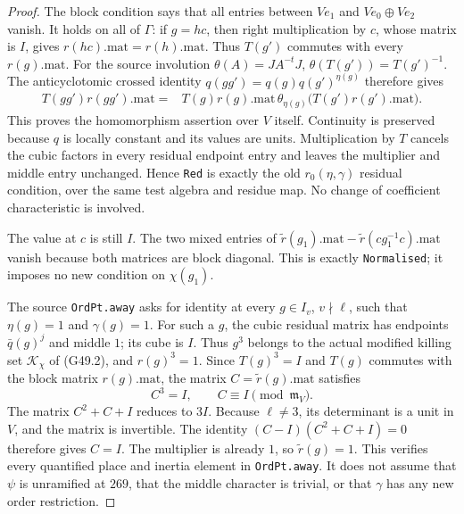 \begin{proof}
The block condition says that all entries between
\(V e_1\) and \(V e_0\oplus V e_2\) vanish.
It holds on all of \(\Gamma\): if \(g=hc\), then
right multiplication by \(c\), whose matrix is \(I\),
gives \(r(hc).\mathrm{mat}=r(h).\mathrm{mat}\).
Thus \(T(g')\) commutes with every \(r(g).\mathrm{mat}\).
For the source involution \(\theta(A)=JA^{-t}J\),
\(\theta(T(g'))=T(g')^{-1}\).
The anticyclotomic crossed identity
\(q(gg')=q(g)q(g')^{\eta(g)}\) therefore gives
\[
 \begin{split}
 T(gg')r(gg').\mathrm{mat}
  ={}&T(g)r(g).\mathrm{mat}\,
       \theta_{\eta(g)}
        \bigl(T(g')r(g').\mathrm{mat}\bigr).
 \end{split}
 \tag{G60.5}
\]
This proves the homomorphism assertion over \(V\) itself.
Continuity is preserved because \(q\) is locally constant
and its values are units.  Multiplication by \(T\) cancels
the cubic factors in every residual endpoint entry and
leaves the multiplier and middle entry unchanged.
Hence \texttt{Red} is exactly the old \(r_0(\eta,\gamma)\)
residual condition, over the same test algebra and residue
map.  No change of coefficient characteristic is involved.

The value at \(c\) is still \(I\).
The two mixed entries of
\(\widetilde r(g_1).\mathrm{mat}
 -\widetilde r(cg_1^{-1}c).\mathrm{mat}\)
vanish because both matrices are block diagonal.
This is exactly \texttt{Normalised}; it imposes no new
condition on \(\chi(g_1)\).

The source \texttt{OrdPt.away} asks for identity at every
\(g\in I_v\), \(v\nmid\ell\), such that
\(\eta(g)=1\) and \(\gamma(g)=1\).
For such a \(g\), the cubic residual matrix has endpoints
\(\bar q(g)^j\) and middle \(1\); its cube is \(I\).
Thus \(g^3\) belongs to the actual modified killing set
\(\mathcal K_\chi\) of (G49.2), and \(r(g)^3=1\).
Since \(T(g)^3=I\) and \(T(g)\) commutes with the block
matrix \(r(g).\mathrm{mat}\), the matrix
\(C=\widetilde r(g).\mathrm{mat}\) satisfies
\[
        C^3=I,\qquad C\equiv I\pmod{\mathfrak m_V}.
 \tag{G60.6}
\]
The matrix \(C^2+C+I\) reduces to \(3I\).
Because \(\ell\ne3\), its determinant is a unit in
\(V\), and the matrix is invertible.
The identity \((C-I)(C^2+C+I)=0\) therefore gives
\(C=I\).  The multiplier is already \(1\), so
\(\widetilde r(g)=1\).
This verifies every quantified place and inertia element
in \texttt{OrdPt.away}.  It does not assume that
\(\psi\) is unramified at \(269\), that the middle
character is trivial, or that \(\gamma\) has any new
order restriction.


\end{proof}
